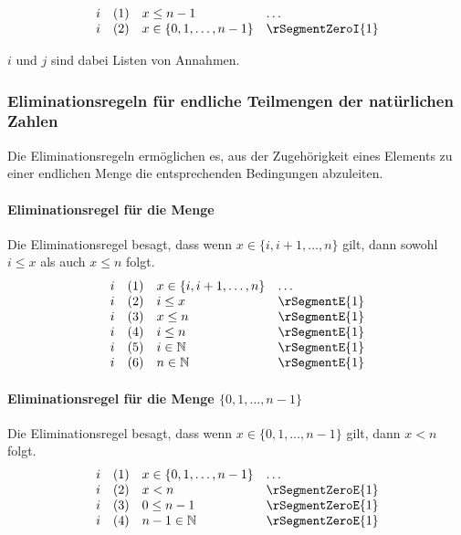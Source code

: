 \documentclass{book}
\theoremstyle{plain}
\theoremstyle{remark}
\theoremstyle{definition}
\begin{document}
\[
\begin{array}{llll}
    i   & (1) & x \leq n-1 & \dots \\
    i   & (2) & x \in \{0, 1, \dots, n-1\} & \rSegmentZeroI{1}
\end{array}
\]

\(i\) und \(j\) sind dabei Listen von Annahmen.

\subsubsection{Eliminationsregeln für endliche Teilmengen der natürlichen Zahlen}
\label{rule:rSegmentE}
Die Eliminationsregeln ermöglichen es, aus der Zugehörigkeit eines Elements zu einer endlichen Menge die entsprechenden Bedingungen abzuleiten.

\paragraph{Eliminationsregel für die Menge}
Die Eliminationsregel besagt, dass wenn \(x \in \{i, i+1, \dots, n\}\) gilt, dann sowohl \(i \leq x\) als auch \(x \leq n\) folgt.
\[
\begin{array}{llll}
    i & (1) & x \in \{i, i+1, \dots, n\} & \dots \\
    i & (2) & i \leq x & \rSegmentE{1} \\
    i & (3) & x \leq n & \rSegmentE{1} \\
    i & (4) & i \leq n & \rSegmentE{1} \\
    i & (5) & i\in\mathbb{N} & \rSegmentE{1} \\
    i & (6) & n\in\mathbb{N} & \rSegmentE{1} \\
\end{array}
\]

\paragraph{Eliminationsregel für die Menge \(\{0, 1, \dots, n-1\}\)}
\label{rule:rSegmentZeroE}
Die Eliminationsregel besagt, dass wenn \(x \in \{0, 1, \dots, n-1\}\) gilt, dann \(x < n\) folgt.
\[
\begin{array}{llll}
    i & (1) & x \in \{0, 1, \dots, n-1\} & \dots \\
    i & (2) & x < n & \rSegmentZeroE{1} \\
    i & (3) & 0 \leq n-1 & \rSegmentZeroE{1} \\
    i & (4) & n-1\in\mathbb{N} & \rSegmentZeroE{1} \\
\end{array}
\]
\end{document}
